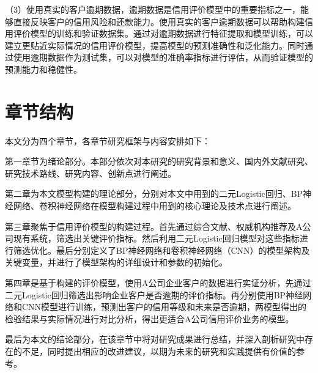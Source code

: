 （3）使用真实的客户逾期数据，逾期数据是信用评价模型中的重要指标之一，能够直接反映客户的信用风险和还款能力。使用真实的客户逾期数据可以帮助构建信用评价模型的训练和验证数据集。通过对逾期数据进行特征提取和模型训练，可以建立更贴近实际情况的信用评价模型，提高模型的预测准确性和泛化能力。同时通过使用逾期数据作为测试集，可以对模型的准确率指标进行评估，从而验证模型的预测能力和稳健性。

\section{章节结构}
本文分为四个章节，各章节研究框架与内容安排如下：

第一章节为绪论部分。本部分依次对本研究的研究背景和意义、国内外文献研究、研究技术路线、研究内容、创新点进行阐述。

第二章为本文模型构建的理论部分，分别对本文中用到的二元Logistic回归、BP神经网络、卷积神经网络在模型构建过程中用到的核心理论及技术点进行阐述。

第三章聚焦于信用评价模型的构建过程。首先通过综合文献、权威机构推荐及A公司现有系统，筛选出关键评价指标。然后利用二元Logistic回归模型对这些指标进行筛选优化。最后分别定义了BP神经网络和卷积神经网络（CNN）的模型架构及关键变量，并进行了模型架构的详细设计和参数的初始化。

第四章是基于构建的评价模型，使用A公司企业客户的数据进行实证分析，先通过二元Logistic回归筛选出影响企业客户是否逾期的评价指标。再分别使用BP神经网络和CNN模型进行训练，预测出客户的信用等级和未来是否逾期，两模型得出的检验结果与实际情况进行对比分析，得出更适合A公司信用评价业务的模型。

最后为本文的结论部分，在该章节中将对研究成果进行总结，并深入剖析研究中存在的不足，同时提出相应的改进建议，以期为未来的研究和实践提供有价值的参考。